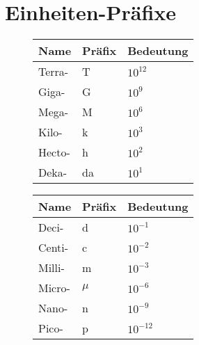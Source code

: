 \documentclass[12pt,a4paper]{paper}
\begin{document}
\section{Einheiten-Präfixe}
\begin{figure}[h]
	\begin{minipage}{.5\textwidth}
	\begin{tabularx}{\textwidth}{|X|X|X|}
	\hline
	Name & Präfix & Bedeutung\\
	\hline
	Terra- & T & $10^{12}$\\
	\hline
	Giga- & G & $10^9$\\
	\hline
	Mega- & M & $10^6$\\
	\hline
	Kilo- & k & $10^3$\\
	\hline
	Hecto- & h & $10^2$\\
	\hline
	Deka- & da & $10^1$\\
	\hline
\end{tabularx}
\end{minipage}
	\begin{minipage}{.5\textwidth}
	\begin{tabularx}{\textwidth}{|X|X|X|}
	\hline
	Name & Präfix & Bedeutung\\
	\hline
	Deci- & d & $10^{-1}$\\
	\hline
	Centi- & c & $10^{-2}$\\
	\hline
	Milli- & m & $10^{-3}$\\
	\hline
	Micro- & $\mu$ & $10^{-6}$\\
	\hline
	Nano- & n & $10^{-9}$\\
	\hline
	Pico- & p & $10^{-12}$\\
	\hline
\end{tabularx}
\end{minipage}
\end{figure}
\end{document}
